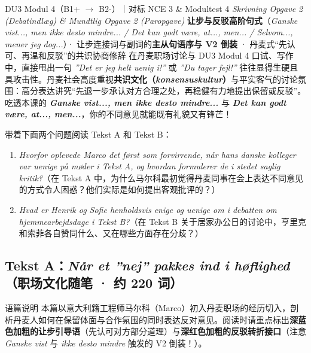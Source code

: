 {DU3 Modul 4（B1+ $\rightarrow$ B2-）｜对标 NCE 3 \& Modultest 4 \textit{Skrivning Opgave 2 (Debatindlæg) \& Mundtlig Opgave 2 (Paropgave)}}
{\textbf{让步与反驳高阶句式}（\textit{Ganske vist..., men ikke desto mindre... / Det kan godt være, at..., men... / Selvom..., mener jeg dog...}）· 让步连接词与副词的\textbf{主从句语序与 V2 倒装} · 丹麦式“先认可、再温和反驳”的共识协商修辞}
{在丹麦职场讨论与 DU3 Modul 4 口试、写作中，直接甩出一句 \textit{”Det er jeg helt uenig i!”} 或 \textit{”Du tager fejl!”} 往往显得生硬且具攻击性。丹麦社会高度重视\textbf{共识文化（\textit{konsensuskultur}）}与平实客气的讨论氛围：高分表达讲究“先退一步承认对方合理之处，再稳健有力地提出保留或反驳”。吃透本课的 \textbf{\textit{Ganske vist..., men ikke desto mindre...}} 与 \textbf{\textit{Det kan godt være, at..., men...}}，你的不同意见就能既有礼貌又有锋芒！}

\begin{foerduleaeser}
带着下面两个问题阅读 Tekst A 和 Tekst B：
\begin{enumerate}
  \item \textit{Hvorfor oplevede Marco det først som forvirrende, når hans danske kolleger var uenige på møder i Tekst A, og hvordan formulerer de i stedet saglig kritik?}（在 Tekst A 中，为什么马尔科最初觉得丹麦同事在会上表达不同意见的方式令人困惑？他们实际是如何提出客观批评的？）
  \item \textit{Hvad er Henrik og Sofie henholdsvis enige og uenige om i debatten om hjemmearbejdsdage i Tekst B?}（在 Tekst B 关于居家办公日的讨论中，亨里克和索菲各自赞同什么、又在哪些方面存在分歧？）
\end{enumerate}
\end{foerduleaeser}


\subsection*{Tekst A：\textit{Når et ”nej” pakkes ind i høflighed}（职场文化随笔 · 约 220 词）}

\begin{tipbox}{语篇说明}
本篇以意大利籍工程师马尔科（Marco）初入丹麦职场的经历切入，剖析丹麦人如何在保留体面与合作氛围的同时表达反对意见。阅读时请重点标出\textbf{\color{NCDNavy}深蓝色加粗的让步引导语}（先认可对方部分道理）与\textbf{\color{NCDRed}深红色加粗的反驳转折接口}（注意 \textit{Ganske vist} 与 \textit{ikke desto mindre} 触发的 V2 倒装！）。
\end{tipbox}

